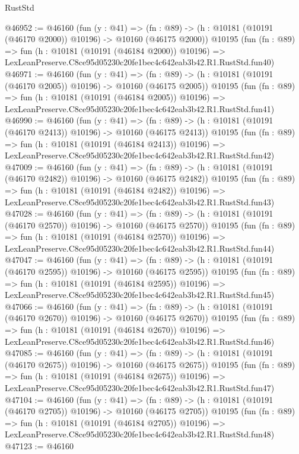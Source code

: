 \begin{lexlean}{RustStd}
\begin{coremodule}
@46952 := @46160
    (fun (y : @41) =>
    (fn : @89) -> (h : @10181 (@10191 (@46170 @2000)) @10196) -> @10160 (@46175 @2000))
    @10195
    (fun (fn : @89) =>
    fun (h : @10181 (@10191 (@46184 @2000)) @10196) =>
    LexLeanPreserve.C8ce95d05230c20fe1bec4c642eab3b42.R1.RustStd.fun40)
@46971 := @46160
    (fun (y : @41) =>
    (fn : @89) -> (h : @10181 (@10191 (@46170 @2005)) @10196) -> @10160 (@46175 @2005))
    @10195
    (fun (fn : @89) =>
    fun (h : @10181 (@10191 (@46184 @2005)) @10196) =>
    LexLeanPreserve.C8ce95d05230c20fe1bec4c642eab3b42.R1.RustStd.fun41)
@46990 := @46160
    (fun (y : @41) =>
    (fn : @89) -> (h : @10181 (@10191 (@46170 @2413)) @10196) -> @10160 (@46175 @2413))
    @10195
    (fun (fn : @89) =>
    fun (h : @10181 (@10191 (@46184 @2413)) @10196) =>
    LexLeanPreserve.C8ce95d05230c20fe1bec4c642eab3b42.R1.RustStd.fun42)
@47009 := @46160
    (fun (y : @41) =>
    (fn : @89) -> (h : @10181 (@10191 (@46170 @2482)) @10196) -> @10160 (@46175 @2482))
    @10195
    (fun (fn : @89) =>
    fun (h : @10181 (@10191 (@46184 @2482)) @10196) =>
    LexLeanPreserve.C8ce95d05230c20fe1bec4c642eab3b42.R1.RustStd.fun43)
@47028 := @46160
    (fun (y : @41) =>
    (fn : @89) -> (h : @10181 (@10191 (@46170 @2570)) @10196) -> @10160 (@46175 @2570))
    @10195
    (fun (fn : @89) =>
    fun (h : @10181 (@10191 (@46184 @2570)) @10196) =>
    LexLeanPreserve.C8ce95d05230c20fe1bec4c642eab3b42.R1.RustStd.fun44)
@47047 := @46160
    (fun (y : @41) =>
    (fn : @89) -> (h : @10181 (@10191 (@46170 @2595)) @10196) -> @10160 (@46175 @2595))
    @10195
    (fun (fn : @89) =>
    fun (h : @10181 (@10191 (@46184 @2595)) @10196) =>
    LexLeanPreserve.C8ce95d05230c20fe1bec4c642eab3b42.R1.RustStd.fun45)
@47066 := @46160
    (fun (y : @41) =>
    (fn : @89) -> (h : @10181 (@10191 (@46170 @2670)) @10196) -> @10160 (@46175 @2670))
    @10195
    (fun (fn : @89) =>
    fun (h : @10181 (@10191 (@46184 @2670)) @10196) =>
    LexLeanPreserve.C8ce95d05230c20fe1bec4c642eab3b42.R1.RustStd.fun46)
@47085 := @46160
    (fun (y : @41) =>
    (fn : @89) -> (h : @10181 (@10191 (@46170 @2675)) @10196) -> @10160 (@46175 @2675))
    @10195
    (fun (fn : @89) =>
    fun (h : @10181 (@10191 (@46184 @2675)) @10196) =>
    LexLeanPreserve.C8ce95d05230c20fe1bec4c642eab3b42.R1.RustStd.fun47)
@47104 := @46160
    (fun (y : @41) =>
    (fn : @89) -> (h : @10181 (@10191 (@46170 @2705)) @10196) -> @10160 (@46175 @2705))
    @10195
    (fun (fn : @89) =>
    fun (h : @10181 (@10191 (@46184 @2705)) @10196) =>
    LexLeanPreserve.C8ce95d05230c20fe1bec4c642eab3b42.R1.RustStd.fun48)
@47123 := @46160

\end{coremodule}
\end{lexlean}
